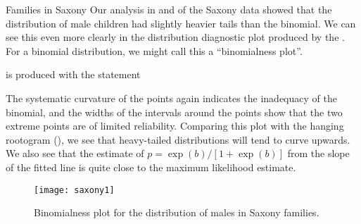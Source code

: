 \begin{Example}[saxony3]{Families in Saxony}
Our analysis in  and  of
the Saxony data
showed that the distribution of male children had slightly heavier tails
than the binomial.
We can see this even more clearly in the distribution diagnostic
plot produced
by the .  For a binomial distribution, we might call
this a ``binomialness plot''.

 is produced with the statement
\begin{listing}
\end{listing}
The systematic curvature of the points again indicates the inadequacy
of the binomial, and the widths of the intervals around the points
show that the two extreme points are of limited reliability.
Comparing this plot with the hanging rootogram (),
we see that heavy-tailed distributions will tend to curve upwards.
We also see that the estimate of $p = \exp(b) / [1+\exp(b)] $ from the slope of the fitted
line is quite close to the maximum likelihood estimate.
\begin{figure}[htb]
  \centering
  \texttt{[image: saxony1]}
  \caption{Binomialness plot for the distribution of males in Saxony families. }%
  \label{fig:saxony1}
\end{figure}
\end{Example}
